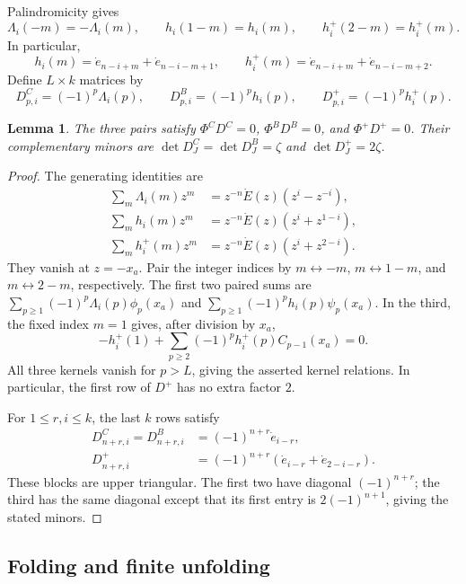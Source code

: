 \documentclass[12pt]{article}
\newtheorem{lemma}[theorem]{Lemma}
\numberwithin{equation}{section}
\newcommand{\dote}{\dot e}
\newcommand{\dotE}{\dot E}
\newcommand{\ph}{\phi}
\newcommand{\ps}{\psi}
\begin{document}
Palindromicity gives
\begin{equation}\label{eq:coefficient-reflections}
 \Lambda_i(-m)=-\Lambda_i(m),\qquad
 h_i(1-m)=h_i(m),\qquad h_i^+(2-m)=h_i^+(m).
\end{equation}
In particular,
\[
 h_i(m)=\dote_{n-i+m}+\dote_{n-i-m+1},\qquad
 h_i^+(m)=\dote_{n-i+m}+\dote_{n-i-m+2}.
\]
Define $L\times k$ matrices by
\begin{equation}\label{eq:D}
 D^C_{p,i}=(-1)^p\Lambda_i(p),\qquad
 D^B_{p,i}=(-1)^ph_i(p),\qquad
 D^+_{p,i}=(-1)^ph_i^+(p).
\end{equation}

\begin{lemma}\label{lem:coefficient-kernels}
The three pairs satisfy $\Phi^C D^C=0$, $\Phi^B D^B=0$, and
$\Phi^+D^+=0$.  Their complementary minors are
$\det D^C_J=\det D^B_J=\zeta$ and $\det D^+_J=2\zeta$.
\end{lemma}

\begin{proof}
The generating identities are
\begin{align*}
 \sum_m\Lambda_i(m)z^m&=z^{-n}\dotE(z)(z^i-z^{-i}),\\
 \sum_m h_i(m)z^m&=z^{-n}\dotE(z)(z^i+z^{1-i}),\\
 \sum_m h_i^+(m)z^m&=z^{-n}\dotE(z)(z^i+z^{2-i}).
\end{align*}
They vanish at $z=-x_a$.  Pair the integer indices by
$m\leftrightarrow-m$, $m\leftrightarrow1-m$, and
$m\leftrightarrow2-m$, respectively.  The first two paired sums are
$\sum_{p\ge1}(-1)^p\Lambda_i(p)\ph_p(x_a)$ and
$\sum_{p\ge1}(-1)^ph_i(p)\ps_p(x_a)$.
In the third, the fixed index $m=1$ gives, after division by $x_a$,
\[
 -h_i^+(1)+\sum_{p\ge2}(-1)^ph_i^+(p)C_{p-1}(x_a)=0.
\]
All three kernels vanish for $p>L$, giving the asserted kernel
relations.  In particular, the first row of $D^+$ has no extra factor $2$.

For $1\le r,i\le k$, the last $k$ rows satisfy
\begin{align*}
 D^C_{n+r,i}=D^B_{n+r,i}&=(-1)^{n+r}\dote_{i-r},\\
 D^+_{n+r,i}&=(-1)^{n+r}
       (\dote_{i-r}+\dote_{2-i-r}).
\end{align*}
These blocks are upper triangular.  The first two have diagonal
$(-1)^{n+r}$; the third has the same diagonal except that its first
entry is $2(-1)^{n+1}$, giving the stated minors.
\end{proof}

\subsection{Folding and finite unfolding}
\end{document}
